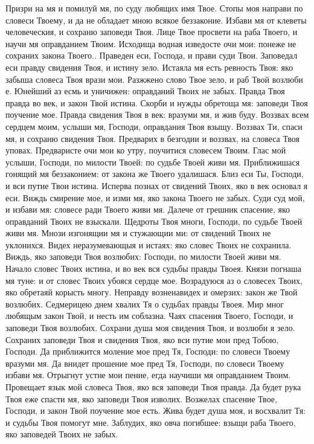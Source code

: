 \begin{mymulticols}
Призри на мя и помилуй мя, по суду любящих имя Твое. Стопы моя направи по словеси Твоему, и да не обладает мною всякое беззаконие. Избави мя от клеветы человеческия, и сохраню заповеди Твоя. Лице Твое просвети на раба Твоего, и научи мя оправданием Твоим. Исходища водная изведосте очи мои: понеже не сохраних закона Твоего.. Праведен еси, Господа, и прави суди Твои. Заповедал еси правду свидения Твоя, и истину зело. Истаяла мя есть ревность Твоя: яко забыша словеса Твоя врази мои. Разжжено слово Твое зело, и раб Твой возлюби е. Юнейший аз есмь и уничижен: оправданий Твоих не забых. Правда Твоя правда во век, и закон Твой истина. Скорби и нужды обретоща мя: заповеди Твоя поучение мое. Правда свидения Твоя в век: вразуми мя, и жив буду. Воззвах всем сердцем моим, услыши мя, Господи, оправдания Твоя взыщу. Воззвах Ти, спаси мя, и сохраню свидения Твоя. Предварих в безгодии и воззвах, на словеса Твоя уповах. Предваристе очи мои ко утру, поучитися словесем Твоим. Глас мой услыши, Господи, по милости Твоей: по судьбе Твоей живи мя. Приближишася гонящий мя беззаконием: от закона же Твоего удалишася. Близ еси Ты, Господи, и вси путие Твои истина. Исперва познах от свидений Твоих, яко в век основал я еси. Виждь смирение мое, и изми мя, яко закона Твоего не забых. Суди суд мой, и избави мя: словесе ради Твоего живи мя. Далече от грешник спасение, яко оправданий Твоих не взыскали. Щедроты Твоя многи, Господи, по судьбе Твоей живи мя. Мнози изгонящии мя и стужающии ми: от свидений Твоих не уклонихся. Видех неразумевающыя и истаях: яко словес Твоих не сохранила. Виждь, яко заповеди Твоя возлюбих: Господи, по милости Твоей живи мя. Начало словес Твоих истина, и во век вся судьбы правды Твоея. Князи погнаша мя туне: и от словес Твоих убояся сердце мое. Возрадуюся аз о словесех Твоих, яко обретаяй корысть многу. Неправду возненавидех и омерзих: закон же Твой возлюбих. Седмерицею днем хвалих Тя о судьбах правды Твоея. Мир мног любящым закон Твой, и несть им соблазна. Чаях спасения Твоего, Господи, и заповеди Твоя возлюбих. Сохрани душа моя свидения Твоя, и возлюби я зело. Сохраних заповеди Твоя и свидения Твоя, яко вси путие мои пред Тобою, Господи. Да приближится моление мое пред Тя, Господи: по словеси Твоему вразуми мя. Да внидет прошение мое пред Тя, Господи, по словеси Твоему избави мя. Отрыгнут устне мои пение, егда научиши мя оправданием Твоим. Провещает язык мой словеса Твоя, яко вся заповеди Твоя правда. Да будет рука Твоя еже спасти мя, яко заповеди Твоя изволих. Возжелах спасение Твое, Господи, и закон Твой поучение мое есть. Жива будет душа моя, и восхвалит Тя: и судьбы Твоя помогут мне. Заблудих, яко овча погибшее: взыщи раба Твоего, яко заповедей Твоих не забых. 


\end{mymulticols}
